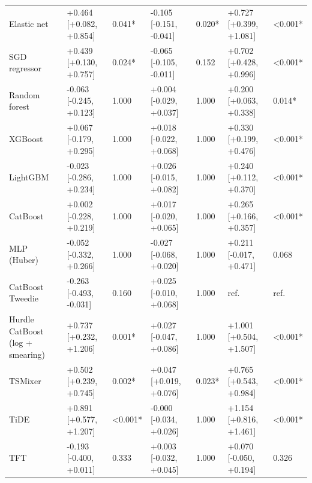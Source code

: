 \begin{longtable}{lllllll}
Elastic net & +0.464 [+0.082, +0.854] & 0.041* & -0.105 [-0.151, -0.041] & 0.020* & +0.727 [+0.399, +1.081] & <0.001* \\
SGD regressor & +0.439 [+0.130, +0.757] & 0.024* & -0.065 [-0.105, -0.011] & 0.152 & +0.702 [+0.428, +0.996] & <0.001* \\
Random forest & -0.063 [-0.245, +0.123] & 1.000 & +0.004 [-0.029, +0.037] & 1.000 & +0.200 [+0.063, +0.338] & 0.014* \\
XGBoost & +0.067 [-0.179, +0.295] & 1.000 & +0.018 [-0.022, +0.068] & 1.000 & +0.330 [+0.199, +0.476] & <0.001* \\
LightGBM & -0.023 [-0.286, +0.234] & 1.000 & +0.026 [-0.015, +0.082] & 1.000 & +0.240 [+0.112, +0.370] & <0.001* \\
CatBoost & +0.002 [-0.228, +0.219] & 1.000 & +0.017 [-0.020, +0.065] & 1.000 & +0.265 [+0.166, +0.357] & <0.001* \\
MLP (Huber) & -0.052 [-0.332, +0.266] & 1.000 & -0.027 [-0.068, +0.020] & 1.000 & +0.211 [-0.017, +0.471] & 0.068 \\
CatBoost Tweedie & -0.263 [-0.493, -0.031] & 0.160 & +0.025 [-0.010, +0.068] & 1.000 & ref. & ref. \\
Hurdle CatBoost (log + smearing) & +0.737 [+0.232, +1.206] & 0.001* & +0.027 [-0.047, +0.086] & 1.000 & +1.001 [+0.504, +1.507] & <0.001* \\
TSMixer & +0.502 [+0.239, +0.745] & 0.002* & +0.047 [+0.019, +0.076] & 0.023* & +0.765 [+0.543, +0.984] & <0.001* \\
TiDE & +0.891 [+0.577, +1.207] & <0.001* & -0.000 [-0.034, +0.026] & 1.000 & +1.154 [+0.816, +1.461] & <0.001* \\
TFT & -0.193 [-0.400, +0.011] & 0.333 & +0.003 [-0.032, +0.045] & 1.000 & +0.070 [-0.050, +0.194] & 0.326 \\
\end{longtable}
